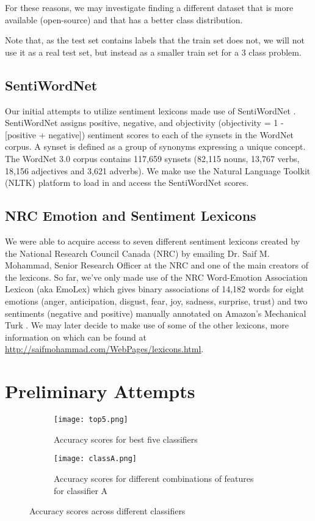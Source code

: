 \documentclass[10pt]{article}
\begin{document}
For these reasons, we may investigate finding a different dataset that is more available (open-source) and that has a better class distribution.

Note that, as the test set contains labels that the train set does not, we will not use it as a real test set, but instead as a smaller train set for a 3 class problem.

\subsection{SentiWordNet}
Our initial attempts to utilize sentiment lexicons made use of SentiWordNet \cite{baccianella2010sentiwordnet}. SentiWordNet assigns positive, negative, and objectivity (objectivity = 1 - [positive + negative]) sentiment scores to each of the synsets in the WordNet \cite{Miller:1995:WLD:219717.219748} corpus. A synset is defined as a group of synonyms expressing a unique concept. The WordNet 3.0 corpus contains 117,659 synsets (82,115 nouns, 13,767 verbs, 18,156 adjectives and 3,621 adverbs). We make use the Natural Language Toolkit (NLTK) platform to load in and access the SentiWordNet scores.

\subsection{NRC Emotion and Sentiment Lexicons}
We were able to acquire access to seven different sentiment lexicons created by the National Research Council Canada (NRC) by emailing Dr. Saif M. Mohammad, Senior Research Officer at the NRC and one of the main creators of the lexicons. So far, we've only made use of the NRC Word-Emotion Association Lexicon (aka EmoLex) which gives binary associations of 14,182 words for eight emotions (anger, anticipation, disgust, fear, joy, sadness, surprise, trust) and two sentiments (negative and positive) manually annotated on Amazon's Mechanical Turk \cite{Mohammad13}. We may later decide to make use of some of the other lexicons, more information on which can be found at  \url{http://saifmohammad.com/WebPages/lexicons.html}.

\section{Preliminary Attempts}
\begin{figure}
\centering
\begin{subfigure}{.5\textwidth}
  \centering
  \texttt{[image: top5.png]}
  \caption{Accuracy scores for best five classifiers}
  \label{fig:topfive}
\end{subfigure}%
\begin{subfigure}{.5\textwidth}
  \centering
  \texttt{[image: classA.png]}
  \caption{Accuracy scores for different combinations of features for classifier A}
  \label{fig:classifierA}
\end{subfigure}
\caption{Accuracy scores across different classifiers}
\label{fig:overivew}
\end{figure}
\end{document}
